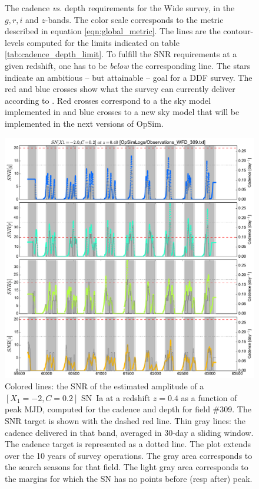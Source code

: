 \documentclass[\docopts]{\docclass}
\begin{document}
\begin{figure}[t]
\begin{center}
\caption{The cadence {\em vs.} depth requirements for the Wide survey,
  in the $g, r, i$ and $z$-bands. The color scale corresponds to the
  metric described in equation \ref{eqn:global_metric}.  The lines are
  the contour-levels computed for the limits indicated on table
  \ref{tab:cadence_depth_limit}. To fulfill the SNR requirements at a
  given redshift, one has to be {\em below} the corresponding
  line. The stars indicate an ambitious -- but attainable -- goal for
  a DDF survey.  The red and blue crosses show what the survey can currently
  deliver according to . Red crosses correspond to
  a the sky model implemented in  and blue crosses to a
  new sky model that will be implemented in the next versions of OpSim.}
\label{fig:m5_cadence_limits_wide}
\end{center}
\end{figure}

\begin{figure}[t]
  \begin{center}
    \includegraphics[width=\linewidth]{metric_WFD_309.pdf}
    \caption{Colored lines: the SNR of the estimated amplitude of a
      $[X_1=-2, C=0.2]$ SN~Ia at a redshift $z = 0.4$ as a function of
      peak MJD, computed for the  cadence and depth
      for field \#309. The SNR target is shown with the dashed red
      line.  Thin gray lines: the cadence delivered in that band,
      averaged in 30-day a sliding window.  The cadence target is
      represented as a dotted line. The plot extends over the 10 years
      of survey operations. The gray area corresponds to the search
      seasons for that field. The light gray area corresponds to the
      margins for which the SN has no points before (resp after)
      peak.}
    \label{fig:snr_metric_wide}
  \end{center}
\end{figure}
\end{document}
